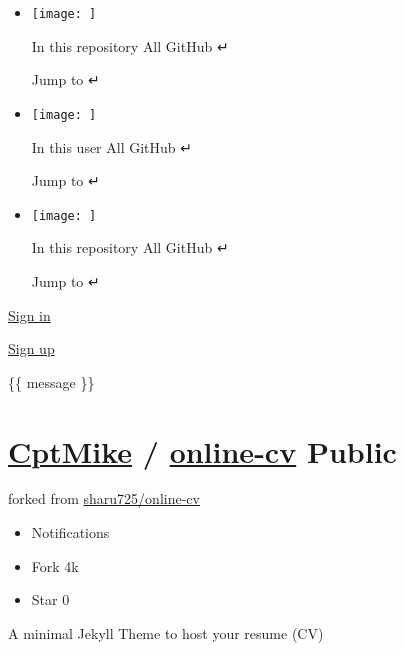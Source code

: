 \documentclass[]{article}
\providecommand{\tightlist}{%
  \setlength{\itemsep}{0pt}\setlength{\parskip}{0pt}}
\begin{document}
\begin{itemize}
\tightlist
\item
  \href{}{}

  \texttt{[image: ]}

  { In this repository } { All GitHub } {↵}

  Jump to {↵}
\item
  \href{}{}

  \texttt{[image: ]}

  { In this user } { All GitHub } {↵}

  Jump to {↵}
\item
  \href{}{}

  \texttt{[image: ]}

  { In this repository } { All GitHub } {↵}

  Jump to {↵}
\end{itemize}

\href{/login?return_to=https\%3A\%2F\%2Fgithub.com\%2FCptMike\%2Fonline-cv}{Sign
in}

\href{/signup?ref_cta=Sign+up\&ref_loc=header+logged+out\&ref_page=\%2F\%3Cuser-name\%3E\%2F\%3Crepo-name\%3E\&source=header-repo\&source_repo=CptMike\%2Fonline-cv}{Sign
up}

\hypertarget{start-of-content}{}

\hypertarget{js-flash-container}{}
\{\{ message \}\}

\hypertarget{repository-container-header}{}
\section{\texorpdfstring{{ \href{/CptMike}{CptMike} } {/}
\textbf{\href{/CptMike/online-cv}{online-cv}}
{}{Public}}{ CptMike  / online-cv Public}}\label{cptmike-online-cv-public}

{ forked from \href{/sharu725/online-cv}{sharu725/online-cv} }

\begin{itemize}
\item
  Notifications
\item
  Fork \protect\hypertarget{repo-network-counter}{}{4k}
\item
  { Star } \protect\hypertarget{repo-stars-counter-star}{}{0}
\end{itemize}

\hypertarget{responsive-meta-container}{}
A minimal Jekyll Theme to host your resume (CV)
\end{document}

